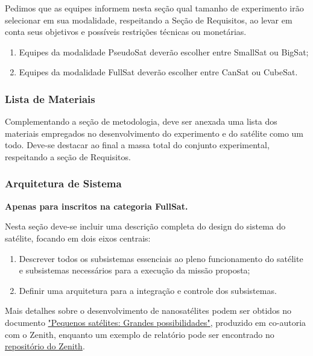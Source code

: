             Pedimos que as equipes informem nesta seção qual tamanho de experimento irão selecionar em sua modalidade, respeitando a Seção de Requisitos, ao levar em conta seus objetivos e possíveis restrições técnicas ou monetárias.
            \begin{enumerate}
                \item Equipes da modalidade PseudoSat deverão escolher entre SmallSat ou BigSat;
                \item Equipes da modalidade FullSat deverão escolher entre CanSat ou CubeSat.
            \end{enumerate}

        \subsubsection{Lista de Materiais}
            Complementando a seção de metodologia, deve ser anexada uma lista dos materiais empregados no desenvolvimento do experimento e do satélite como um todo. Deve-se destacar ao final a massa total do conjunto experimental, respeitando a seção de Requisitos.

        \subsubsection{Arquitetura de Sistema}
            \textbf{Apenas para inscritos na categoria FullSat.}
            
            Nesta seção deve-se incluir uma descrição completa do design do sistema do satélite, focando em dois eixos centrais:
            \begin{enumerate}
                \item Descrever todos os subsistemas essenciais ao pleno funcionamento do satélite e subsistemas necessários para a execução da missão proposta;
                \item Definir uma arquitetura para a integração e controle dos subsistemas.
            \end{enumerate}

           Mais detalhes sobre o desenvolvimento de nanosatélites podem ser obtidos no documento \href{https://obsat.org.br/ebook/download.php?file=eBook-PequenosSatelites-Dez-2022.pdf}{\color{highcolor}"Pequenos satélites: Grandes possibilidades"}, produzido em co-autoria com o Zenith, enquanto um exemplo de relatório pode ser encontrado no \href{https://github.com/zenitheesc/USPSat-I/blob/master/USPSat_Report.pdf}{\color{highcolor}repositório do Zenith}.
            
